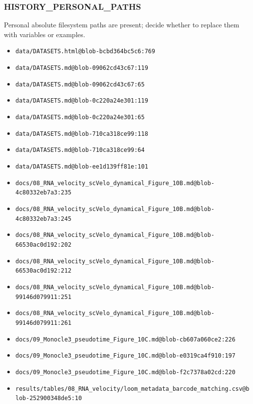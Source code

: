 \documentclass[
]{article}
\providecommand{\tightlist}{%
  \setlength{\itemsep}{0pt}\setlength{\parskip}{0pt}}
\begin{document}
\subsubsection{HISTORY\_PERSONAL\_PATHS}\label{history_personal_paths}

Personal absolute filesystem paths are present; decide whether to
replace them with variables or examples.

\begin{itemize}
\tightlist
\item
  \texttt{data/DATASETS.html@blob-bcbd364bc5c6:769}
\item
  \texttt{data/DATASETS.md@blob-09062cd43c67:119}
\item
  \texttt{data/DATASETS.md@blob-09062cd43c67:65}
\item
  \texttt{data/DATASETS.md@blob-0c220a24e301:119}
\item
  \texttt{data/DATASETS.md@blob-0c220a24e301:65}
\item
  \texttt{data/DATASETS.md@blob-710ca318ce99:118}
\item
  \texttt{data/DATASETS.md@blob-710ca318ce99:64}
\item
  \texttt{data/DATASETS.md@blob-ee1d139ff81e:101}
\item
  \texttt{docs/08\_RNA\_velocity\_scVelo\_dynamical\_Figure\_10B.md@blob-4c80332eb7a3:235}
\item
  \texttt{docs/08\_RNA\_velocity\_scVelo\_dynamical\_Figure\_10B.md@blob-4c80332eb7a3:245}
\item
  \texttt{docs/08\_RNA\_velocity\_scVelo\_dynamical\_Figure\_10B.md@blob-66530ac0d192:202}
\item
  \texttt{docs/08\_RNA\_velocity\_scVelo\_dynamical\_Figure\_10B.md@blob-66530ac0d192:212}
\item
  \texttt{docs/08\_RNA\_velocity\_scVelo\_dynamical\_Figure\_10B.md@blob-99146d079911:251}
\item
  \texttt{docs/08\_RNA\_velocity\_scVelo\_dynamical\_Figure\_10B.md@blob-99146d079911:261}
\item
  \texttt{docs/09\_Monocle3\_pseudotime\_Figure\_10C.md@blob-cb607a060ce2:226}
\item
  \texttt{docs/09\_Monocle3\_pseudotime\_Figure\_10C.md@blob-e0319ca4f910:197}
\item
  \texttt{docs/09\_Monocle3\_pseudotime\_Figure\_10C.md@blob-f2c7378a02cd:220}
\item
  \texttt{results/tables/08\_RNA\_velocity/loom\_metadata\_barcode\_matching.csv@blob-252900348de5:10}

\end{itemize}
\end{document}
